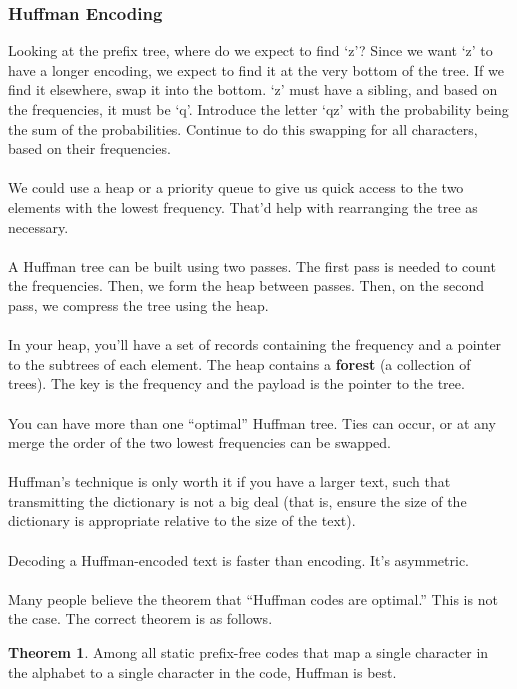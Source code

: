 \documentclass[]{article}
\theoremstyle{definition}
\newtheorem*{theorem}{Theorem}
\newcommand{\lecture}[1]{\marginpar{{\footnotesize $\leftarrow$ \underline{#1}}}}
\begin{document}
			\subsubsection{Huffman Encoding}
				Looking at the prefix tree, where do we expect to find `z'? Since we want `z' to have a longer encoding, we expect to find it at the very bottom of the tree. If we find it elsewhere, swap it into the bottom. `z' must have a sibling, and based on the frequencies, it must be `q'. Introduce the letter `qz' with the probability being the sum of the probabilities. Continue to do this swapping for all characters, based on their frequencies. \lecture{March 28, 2013}
				\\ \\
				We could use a heap or a priority queue to give us quick access to the two elements with the lowest frequency. That'd help with rearranging the tree as necessary.
				\\ \\
				A Huffman tree can be built using two passes. The first pass is needed to count the frequencies. Then, we form the heap between passes. Then, on the second pass, we compress the tree using the heap.
				\\ \\
				In your heap, you'll have a set of records containing the frequency and a pointer to the subtrees of each element. The heap contains a \textbf{forest} (a collection of trees). The key is the frequency and the payload is the pointer to the tree.
				\\ \\
				You can have more than one ``optimal'' Huffman tree. Ties can occur, or at any merge the order of the two lowest frequencies can be swapped.
				\\ \\
				Huffman's technique is only worth it if you have a larger text, such that transmitting the dictionary is not a big deal (that is, ensure the size of the dictionary is appropriate relative to the size of the text).
				\\ \\
				Decoding a Huffman-encoded text is faster than encoding. It's asymmetric.
				\\ \\
				Many people believe the theorem that ``Huffman codes are optimal.'' This is not the case. The correct theorem is as follows.

				\begin{theorem}
					Among all static prefix-free codes that map a single character in the alphabet to a single character in the code, Huffman is best.
				\end{theorem}
\end{document}
